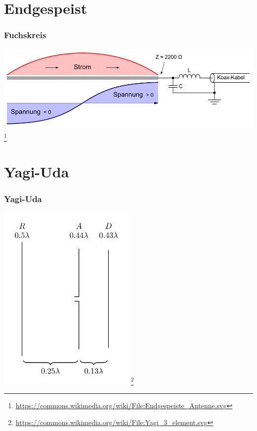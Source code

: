 \section*{Endgespeist}

\begin{frame}
    \frametitle{Fuchskreis}
    \begin{center}
        \includegraphics[width=1\textwidth]{e11/1000px-Endgespeiste_Antenne.png}
        \footnote{\tiny \url{https://commons.wikimedia.org/wiki/File:Endgespeiste_Antenne.svg}}
	\end{center}
\end{frame}

\section*{Yagi-Uda}

\begin{frame}
    \frametitle{Yagi-Uda}
    \begin{center}
        \includegraphics[width=0.5\textwidth]{e11/Yagi_3_element.png}
        \footnote{\tiny \url{https://commons.wikimedia.org/wiki/File:Yagi_3_element.svg}}
	\end{center}
\end{frame}

